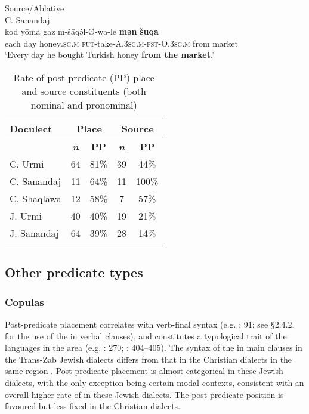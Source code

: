 \documentclass[output=paper,colorlinks,citecolor=brown,draftmode]{langscibook}
\begin{document}
\ea\label{NAINEI:ex:25}
Source/Ablative\\
C. Sanandaj \citep[3:\S 11]{Panoussi1990Senaya} \\
\gll kod yōma gaz m-šāqə́l-Ø-wa-le \textbf{mən} \textbf{šūqa} \\
     each day honey\textsc{.sg.m} \textsc{fut-}take\textsc{-A.3sg.m-pst-O.3sg.m} from market  \\
\glt `Every day he bought Turkish honey \textbf{from the market}.'
\z

\begin{table}
        \begin{tabular}{lcccc}
\lsptoprule
\textbf{Doculect} & \multicolumn{2}{c}{\textbf{Place}} & \multicolumn{2}{c}{\textbf{Source}} \\
\midrule
 & \textbf{\textit{n}} & \textbf{PP} & \textbf{\textit{n}} & \textbf{PP} \\
C. Urmi & 64 & 81\% & 39 & 44\% \\
C. Sanandaj & 11 & 64\% & 11 & 100\% \\
C. Shaqlawa & 12 & 58\% & 7 & 57\% \\
J. Urmi  & 40 & 40\% & 19 & 21\% \\
J. Sanandaj & 64 & 39\% & 28 & 14\% \\
\lspbottomrule
    \end{tabular}
    \caption{Rate of post-predicate (PP) place and source constituents (both nominal and pronominal)}
    \label{NAINEI:tab:6}
\end{table}

\subsection{Other predicate types}
\subsubsection{Copulas}\label{NAINEI:sec:2.3.1}
Post-predicate  placement correlates with verb-final syntax (e.g. \citealt{dryer_word_2007}: 91; see §2.4.2, for the use of the  in verbal clauses), and constitutes a typological trait of the languages in the area (e.g. \citealt{Matras2009LC}: 270; \citealt{haig_western_2017}: 404–405). The syntax of the  in main clauses in the Trans-Zab Jewish dialects differs from that in the Christian dialects in the same region \parencite{Khan2012Copula}. Post-predicate placement is almost categorical in these Jewish dialects, with the only exception being certain modal contexts, consistent with an overall higher rate of  in these Jewish dialects. The post-predicate position is favoured but less fixed in the Christian dialects.
\end{document}
